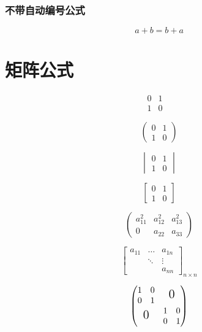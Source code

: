 \documentclass{article} %
\begin{document}
    	\subsubsection{不带自动编号公式}
    		\begin{equation*}
    			a+b=b+a
    		\end{equation*} %
    
    
    
    
    
    
    
    \newpage
    \section{矩阵公式}
   		\[
   			\begin{matrix}%
  				0&1\\
  				1&0
			\end{matrix}\quad
		\]

		\[
			\begin{pmatrix}%
 				0&1\\
				1&0
			\end{pmatrix}
		\]	

		\[
			\begin{vmatrix}%
				0&1\\
				1&0
			\end{vmatrix}
		\]

		\[
			\begin{bmatrix}%
				0&1\\
				1&0
			\end{bmatrix}
		\]


		\[
			\begin{pmatrix}%
				a_{11}^2&a_{12}^2&a_{13}^2\\
				0&a_{22}&a_{33}
			\end{pmatrix}
		\]

		\[
			\begin{bmatrix}%
				a_{11}&\dots & a_{1n}\\
				&\ddots & \vdots\\
				&       & a_{nn}
			\end{bmatrix}_{n \times n} %
		\]

		\[
			\begin{pmatrix}%
				\begin{matrix}
					1&0\\0&1
				\end{matrix}
				& \text{\Large 0}\\
				
				\text{\Large 0}&
				\begin{matrix}
					1&0\\0&1
				\end{matrix}
			\end{pmatrix}
		\]
\end{document}
